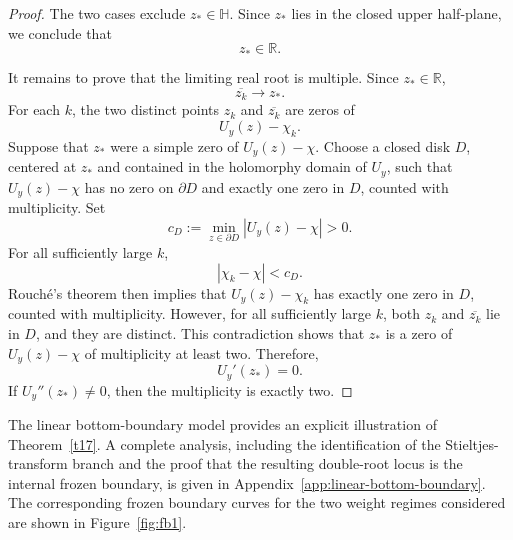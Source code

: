 \documentclass[11pt]{amsart}
\theoremstyle{plain}
\numberwithin{equation}{section}
\numberwithin{theorem}{section}
\numberwithin{figure}{section}
\begin{document}
\begin{proof}
The two cases exclude \(z_*\in\mathbb H\). Since \(z_*\) lies in the closed
upper half-plane, we conclude that
\[
    z_*\in\mathbb R.
\]

It remains to prove that the limiting real root is multiple. Since
\(z_*\in\mathbb R\),
\[
    \overline{z_k}\longrightarrow z_*.
\]
For each \(k\), the two distinct points \(z_k\) and \(\overline{z_k}\) are
zeros of
\[
    U_y(z)-\chi_k.
\]
Suppose that \(z_*\) were a simple zero of \(U_y(z)-\chi\). Choose a closed
disk \(D\), centered at \(z_*\) and contained in the holomorphy domain of
\(U_y\), such that \(U_y(z)-\chi\) has no zero on \(\partial D\) and exactly
one zero in \(D\), counted with multiplicity. Set
\[
    c_D:=\min_{z\in\partial D}|U_y(z)-\chi|>0.
\]
For all sufficiently large \(k\),
\[
    |\chi_k-\chi|<c_D.
\]
Rouch\'e's theorem then implies that \(U_y(z)-\chi_k\) has exactly one zero
in \(D\), counted with multiplicity. However, for all sufficiently large
\(k\), both \(z_k\) and \(\overline{z_k}\) lie in \(D\), and they are
distinct. This contradiction shows that \(z_*\) is a zero of
\(U_y(z)-\chi\) of multiplicity at least two. Therefore,
\[
    U_y'(z_*)=0.
\]
If \(U_y''(z_*)\neq0\), then the multiplicity is exactly two.
\end{proof}

The linear bottom-boundary model provides an explicit illustration of
Theorem~\ref{t17}.  A complete analysis, including the identification of
the Stieltjes-transform branch and the proof that the resulting
double-root locus is the internal frozen boundary, is given in
Appendix~\ref{app:linear-bottom-boundary}. The corresponding frozen boundary curves for the two weight regimes considered 
are shown in Figure~\ref{fig:fb1}.
\end{document}
